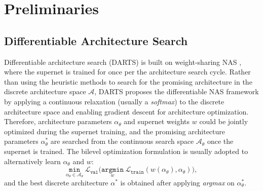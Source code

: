 \documentclass[10pt,twocolumn,letterpaper]{article}
\begin{document}
\section{Preliminaries}
\label{sec2}
\subsection{Differentiable Architecture Search}
\label{sec2.1}

Differentiable architecture search (DARTS) is built on weight-sharing NAS \cite{bender2018understanding,pham2018efficient}, where the supernet is trained for once per the architecture search cycle. Rather than using the heuristic methods \cite{pham2018efficient,zhang2020one} to search for the promising architecture in the discrete architecture space $\mathcal{A}$, DARTS \cite{liu2018darts} proposes the differentiable NAS framework by applying a continuous relaxation (usually a \textit{softmax}) to the discrete architecture space and enabling gradient descent for architecture optimization. Therefore, architecture parameters $\alpha_\theta$ and supernet weights $w$ could be jointly optimized during the supernet training, and the promising architecture parameters $\alpha_\theta^*$ are searched from the continuous search space $\mathcal{A}_\theta$ once the supernet is trained. The bilevel optimization formulation is usually adopted to alternatively learn $\alpha_\theta$ and $w$:
\begin{equation} \label{eq:bilevel}
\underset{\alpha_\theta \in \mathcal{A}_\theta}{\mathtt{min}} \ \mathcal{L}_{\mathtt{val}}\Big(\underset{w}{\mathtt{argmin}}\ \mathcal{L}_{\mathtt{train}}(w(\alpha_\theta),\alpha_\theta)\Big),
\end{equation}
and the best discrete architecture $\alpha^*$ is obtained after applying \textit{argmax} on $\alpha_\theta^*$. 
\end{document}
